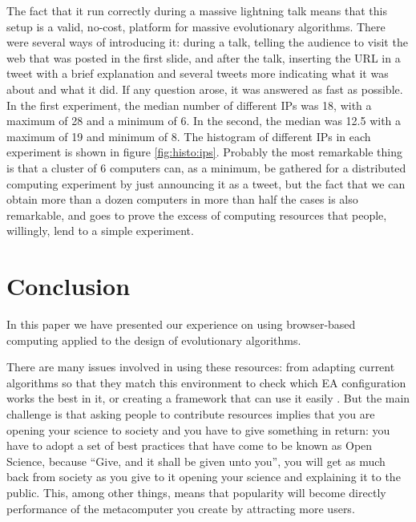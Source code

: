 \documentclass{sig-alternate}
\begin{document}
The fact that it run correctly during a massive lightning talk means that this setup is a
valid, no-cost, platform for massive evolutionary algorithms. There
were several ways of introducing it: during a talk, telling the
audience to visit the web that was posted in the first slide, and
after the talk, inserting the URL in a tweet with a brief explanation
and several tweets more indicating what it was about and what it
did. If any question arose, it was answered as fast as possible. In
the first experiment, the median number of different IPs was 18, with
a maximum of 28 and a minimum of 6. In the second, the median was 12.5
with a maximum of 19 and minimum of 8. The histogram of different IPs
in each experiment is shown in figure \ref{fig:histo:ips}. Probably
the most remarkable thing is that a cluster of 6 computers can, as a
minimum, be gathered for a distributed computing experiment by just
announcing it as a tweet, but the fact that we can obtain more than a
dozen computers in more than half the cases is also remarkable, and
goes to prove the excess of computing resources that people,
willingly, lend to a simple experiment. 

\section{Conclusion}
\label{sec:conc}

In this paper we have presented our experience on using browser-based
computing applied
to the design of evolutionary algorithms.  

There are many issues involved in using these resources: from adapting current algorithms so that they match this environment \cite{agajaj} to check which EA configuration works the best in it, or creating a framework that can use it easily \cite{nodeo2014}. But the main challenge is that asking people to contribute resources implies that you are opening your science to society and you have to give something in return: you have to adopt a set of best practices that have come to be known as Open Science, because ``Give, and it shall be given unto you'', you will get as much back from society as you give to it opening your science and explaining it to the public. This, among other things, means that popularity will become directly performance of the metacomputer you create by attracting more users.




\end{document}
